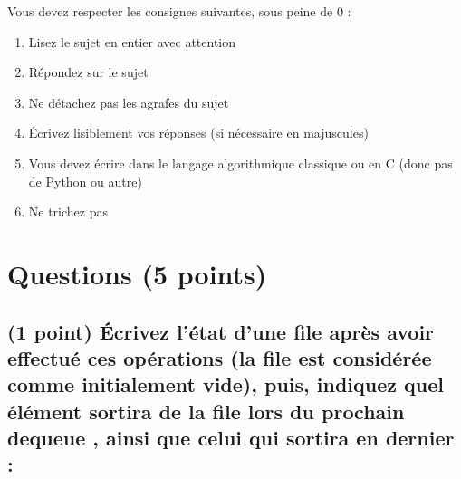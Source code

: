 \documentclass[11pt,a4paper]{article}
\begin{document}
\MakeExamTitle                   %


\bigskip

Vous devez respecter les consignes suivantes, sous peine de 0 :

\begin{enumerate}[label=\Roman*)]
\item Lisez le sujet en entier avec attention
\item Répondez sur le sujet
\item Ne détachez pas les agrafes du sujet
\item \'Ecrivez lisiblement vos réponses (si nécessaire en majuscules)
\item Vous devez écrire dans le langage algorithmique classique ou en C (donc pas de Python ou autre)
\item Ne trichez pas
\end{enumerate}



\section{Questions (5 points)}

\subsection{(1 point) \'Ecrivez l'état d'une file après avoir effectué ces opérations (la file est considérée comme initialement vide), puis, indiquez quel élément sortira de la file lors du prochain \og dequeue \fg{}, ainsi que celui qui sortira en dernier : }

\bigskip
\end{document}
